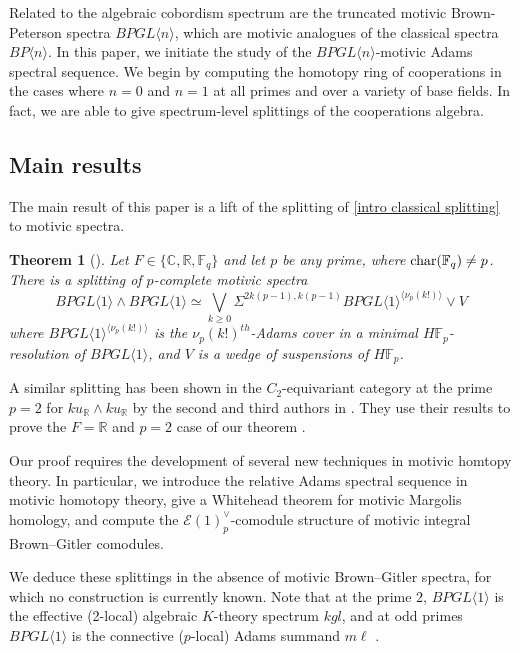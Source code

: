 \documentclass{amsart}
\newtheorem{theorem}{Theorem}[section]
\theoremstyle{plain}
\numberwithin{theorem}{section}
\numberwithin{equation}{section}
\numberwithin{figure}{section}
\newcommand{\mF}{{\mathbb F}}
\newcommand{\0}{\langle 0 \rangle }
\begin{document}
Related to the algebraic cobordism spectrum are the truncated motivic Brown-Peterson spectra $BPGL \langle n\rangle$, which are motivic analogues of the classical spectra $BP \langle n \rangle$. In this paper, we initiate the study of the $BPGL\langle n \rangle$-motivic Adams spectral sequence. We begin by computing the homotopy ring of cooperations in the cases where $n=0$ and $n=1$ at all primes and over a variety of base fields. In fact, we are able to give spectrum-level splittings of the cooperations algebra.

\subsection{Main results}
The main result of this paper is a lift of the splitting of \cref{intro classical splitting} to motivic spectra.
\begin{theorem}[]
    Let $F \in \{\mathbb{C}, \mathbb{R}, \mathbb{F}_q\}$ and let $p$ be any prime, where $\textup{char}(\mathbb{F}_q) \neq p$. There is a splitting of $p$-complete motivic spectra
    \[
    BPGL \langle 1 \rangle \wedge BPGL \langle 1 \rangle \simeq \bigvee_{k \geq 0} \Sigma^{2k(p-1), k(p-1)} BPGL\langle 1 \rangle^{\langle \nu_p (k!) \rangle} \vee V
    \]
    where $BPGL \langle 1 \rangle ^{\langle \nu_{p}(k!) \rangle}$ is the $\nu_{p}(k!)^{th}$-Adams cover in a minimal $H\mF_{p}$-resolution of $BPGL\langle 1 \rangle$, and $V$ is a wedge of suspensions of $H\mF_{p}$.
\end{theorem}

A similar splitting has been shown in the $C_2$-equivariant category at the prime $p=2$ for $ku_\mathbb{R} \wedge ku_\mathbb{R}$ by the second and third authors in \cite[Corollary 6.15]{LiPetTat25}. They use their results to prove the $F=\mathbb{R}$ and $p=2$ case of our theorem \cite[Corollary 6.18]{LPTSplittingkuR}.

Our proof requires the development of several new techniques in motivic homtopy theory. In particular, we introduce the relative Adams spectral sequence in motivic homotopy theory, give a Whitehead theorem for motivic Margolis homology, and compute the $\mathcal{E}(1)^\vee_p$-comodule structure of motivic integral Brown--Gitler comodules.

We deduce these splittings in the absence of motivic Brown--Gitler spectra, for which no construction is currently known. Note that at the prime $2$, $BPGL \langle 1 \rangle$ is the effective (2-local) algebraic $K$-theory spectrum $kgl$, and at odd primes $BPGL \langle 1 \rangle$ is the connective ($p$-local) Adams summand $m\ell$ \cite{NauSpiOst15}. 
\end{document}
